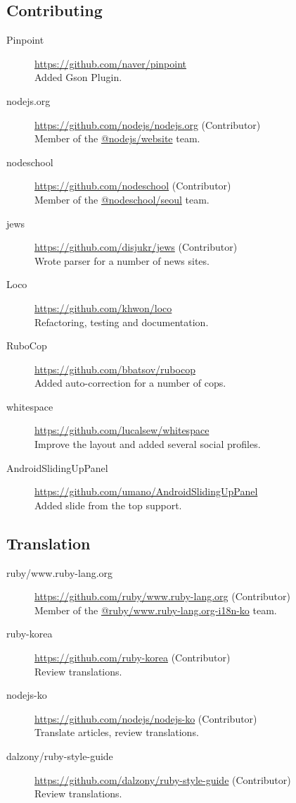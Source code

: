 \documentclass[a4paper,10pt]{article}
\begin{document}
\subsection{Contributing}
\begin{description}
  \item[Pinpoint] \url{https://github.com/naver/pinpoint} \\
    Added Gson Plugin.
  \item[nodejs.org] \url{https://github.com/nodejs/nodejs.org} (Contributor) \\
    Member of the \href{https://github.com/orgs/nodejs/teams/website}{@nodejs/website} team.
  \item[nodeschool] \url{https://github.com/nodeschool} (Contributor) \\
    Member of the \href{https://github.com/orgs/nodeschool/teams/seoul}{@nodeschool/seoul} team.
  \item[jews] \url{https://github.com/disjukr/jews} (Contributor) \\
    Wrote parser for a number of news sites.
  \item[Loco] \url{https://github.com/khwon/loco} \\
    Refactoring, testing and documentation.
  \item[RuboCop] \url{https://github.com/bbatsov/rubocop} \\
    Added auto-correction for a number of cops.
  \item[whitespace] \url{https://github.com/lucalsew/whitespace} \\
    Improve the layout and added several social profiles.
  \item[AndroidSlidingUpPanel] \url{https://github.com/umano/AndroidSlidingUpPanel} \\
    Added slide from the top support.
\end{description}

\subsection{Translation}
\begin{description}
  \item[ruby/www.ruby-lang.org] \url{https://github.com/ruby/www.ruby-lang.org} (Contributor) \\
    Member of the \href{https://github.com/orgs/ruby/teams/www-ruby-lang-org-i18n-ko}{@ruby/www.ruby-lang.org-i18n-ko} team.
  \item[ruby-korea] \url{https://github.com/ruby-korea} (Contributor) \\
    Review translations.
  \item[nodejs-ko] \url{https://github.com/nodejs/nodejs-ko} (Contributor) \\
    Translate articles, review translations.
  \item[dalzony/ruby-style-guide] \url{https://github.com/dalzony/ruby-style-guide} (Contributor) \\
    Review translations.
\end{description}


\end{document}
